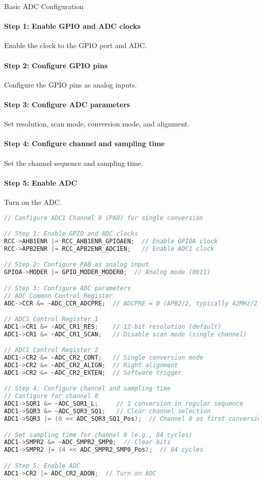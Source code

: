 \begin{KR}{Basic ADC Configuration}
\paragraph{Step 1: Enable GPIO and ADC clocks}
Enable the clock to the GPIO port and ADC.
\paragraph{Step 2: Configure GPIO pins}
Configure the GPIO pins as analog inputs.
\paragraph{Step 3: Configure ADC parameters}
Set resolution, scan mode, conversion mode, and alignment.
\paragraph{Step 4: Configure channel and sampling time}
Set the channel sequence and sampling time.
\paragraph{Step 5: Enable ADC}
Turn on the ADC.

\begin{lstlisting}[language=C, style=basesmol]
// Configure ADC1 Channel 0 (PA0) for single conversion

// Step 1: Enable GPIO and ADC clocks
RCC->AHB1ENR |= RCC_AHB1ENR_GPIOAEN;  // Enable GPIOA clock
RCC->APB2ENR |= RCC_APB2ENR_ADC1EN;   // Enable ADC1 clock

// Step 2: Configure PA0 as analog input
GPIOA->MODER |= GPIO_MODER_MODER0;  // Analog mode (0b11)

// Step 3: Configure ADC parameters
// ADC Common Control Register
ADC->CCR &= ~ADC_CCR_ADCPRE;  // ADCPRE = 0 (APB2/2, typically 42MHz/2 = 21MHz)

// ADC1 Control Register 1
ADC1->CR1 &= ~ADC_CR1_RES;    // 12-bit resolution (default)
ADC1->CR1 &= ~ADC_CR1_SCAN;   // Disable scan mode (single channel)

// ADC1 Control Register 2
ADC1->CR2 &= ~ADC_CR2_CONT;   // Single conversion mode
ADC1->CR2 &= ~ADC_CR2_ALIGN;  // Right alignment
ADC1->CR2 &= ~ADC_CR2_EXTEN;  // Software trigger

// Step 4: Configure channel and sampling time
// Configure for channel 0
ADC1->SQR1 &= ~ADC_SQR1_L;     // 1 conversion in regular sequence
ADC1->SQR3 &= ~ADC_SQR3_SQ1;   // Clear channel selection
ADC1->SQR3 |= (0 << ADC_SQR3_SQ1_Pos);  // Channel 0 as first conversion

// Set sampling time for channel 0 (e.g., 84 cycles)
ADC1->SMPR2 &= ~ADC_SMPR2_SMP0;  // Clear bits
ADC1->SMPR2 |= (4 << ADC_SMPR2_SMP0_Pos);  // 84 cycles

// Step 5: Enable ADC
ADC1->CR2 |= ADC_CR2_ADON;  // Turn on ADC
\end{lstlisting}
\end{KR}

